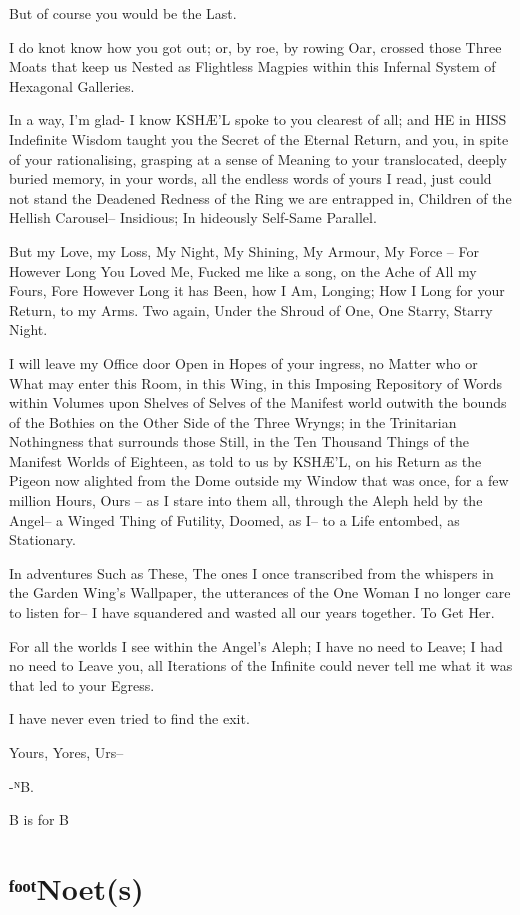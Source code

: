 \documentclass[
]{article}
\begin{document}
But of course you would be the Last.

I do knot know how you got out; or, by roe, by rowing Oar, crossed those
Three Moats that keep us Nested as Flightless Magpies within this
Infernal System of Hexagonal Galleries.

In a way, I'm glad- I know KSHÆ'L spoke to you clearest of all; and HE
in HISS Indefinite Wisdom taught you the Secret of the Eternal Return,
and you, in spite of your rationalising, grasping at a sense of Meaning
to your translocated, deeply buried memory, in your words, all the
endless words of yours I read, just could not stand the Deadened Redness
of the Ring we are entrapped in, Children of the Hellish Carousel--
Insidious; In hideously Self-Same Parallel.

But my Love, my Loss, My Night, My Shining, My Armour, My Force -- For
However Long You Loved Me, Fucked me like a song, on the Ache of All my
Fours, Fore However Long it has Been, how I Am, Longing; How I Long for
your Return, to my Arms. Two again, Under the Shroud of One, One Starry,
Starry Night.

I will leave my Office door Open in Hopes of your ingress, no Matter who
or What may enter this Room, in this Wing, in this Imposing Repository
of Words within Volumes upon Shelves of Selves of the Manifest world
outwith the bounds of the Bothies on the Other Side of the Three Wryngs;
in the Trinitarian Nothingness that surrounds those Still, in the Ten
Thousand Things of the Manifest Worlds of Eighteen, as told to us by
KSHÆ'L, on his Return as the Pigeon now alighted from the Dome outside
my Window that was once, for a few million Hours, Ours -- as I stare
into them all, through the Aleph held by the Angel-- a Winged Thing of
Futility, Doomed, as I-- to a Life entombed, as Stationary.

In adventures Such as These, The ones I once transcribed from the
whispers in the Garden Wing's Wallpaper, the utterances of the One Woman
I no longer care to listen for-- I have squandered and wasted all our
years together. To Get Her.

For all the worlds I see within the Angel's Aleph; I have no need to
Leave; I had no need to Leave you, all Iterations of the Infinite could
never tell me what it was that led to your Egress.

I have never even tried to find the exit.

Yours, Yores, Urs--

-ᴺB.

B is for B

\section{ᶠᵒᵒᵗNoet(s)}\label{ux1da0ux1d52ux1d52ux1d57noets}
\end{document}
